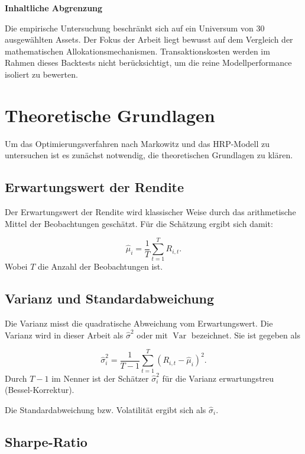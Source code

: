 \documentclass[parskip=half]{scrartcl}
\begin{document}
	\textbf{Inhaltliche Abgrenzung}
	
	Die empirische Untersuchung beschränkt sich auf ein Universum von 30 ausgewählten Assets. Der Fokus der Arbeit liegt bewusst auf dem Vergleich der mathematischen Allokationsmechanismen. Transaktionskosten werden im Rahmen dieses Backtests nicht berücksichtigt, um die reine Modellperformance isoliert zu bewerten.
	
	
	\clearpage
	\section{Theoretische Grundlagen}
	Um das Optimierungsverfahren nach Markowitz und das HRP-Modell zu untersuchen ist es zunächst notwendig, die theoretischen Grundlagen zu klären.
	
	\subsection{Erwartungswert der Rendite}
	Der Erwartungswert der Rendite wird klassischer Weise durch das arithmetische Mittel der Beobachtungen geschätzt. Für die Schätzung ergibt sich damit:
	
	\begin{equation}
		\hat{\mu}_i = \frac{1}{T} \sum_{t=1}^{T} R_{i,t}. \label{eq:erwartungswert}
	\end{equation}
	Wobei $T$ die Anzahl der Beobachtungen ist. \\
	
	\subsection{Varianz und Standardabweichung}
	Die Varianz misst die quadratische Abweichung vom Erwartungswert. Die Varianz wird in dieser Arbeit als $\hat{\sigma}^2$ oder mit $\operatorname{Var}$ bezeichnet. Sie ist gegeben als
	
	\begin{equation}
		\hat{\sigma}_i^2 = \frac{1}{T-1} \sum_{t=1}^{T} (R_{i,t} - \hat{\mu}_i)^2. \label{eq:varianz}
	\end{equation}
	Durch $T-1$ im Nenner ist der Schätzer $\hat{\sigma}_i^2$ für die Varianz erwartungstreu (Bessel-Korrektur).
	
	Die Standardabweichung bzw. Volatilität ergibt sich als $\hat{\sigma}_i$.
	
	\subsection{Sharpe-Ratio}
	
\end{document}
